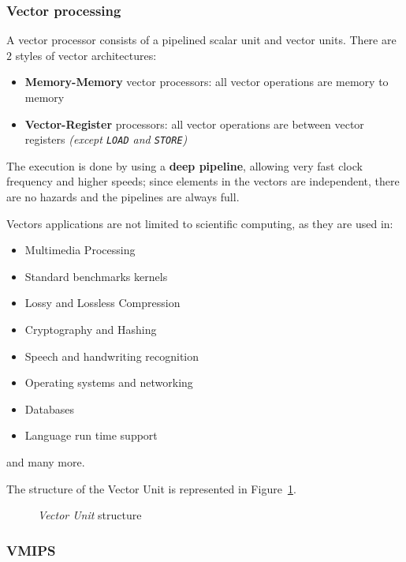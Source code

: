 \documentclass[english]{article}
\begin{document}
\subsubsection{Vector processing}

A vector processor consists of a pipelined scalar unit and vector units.
There are \(2\) styles of vector architectures:

\begin{itemize}
  \item \textbf{Memory-Memory} vector processors: all vector operations are memory to memory
  \item \textbf{Vector-Register} processors: all vector operations are between vector registers \textit{(except \texttt{LOAD} and \texttt{STORE})}
\end{itemize}

The execution is done by using a \textbf{deep pipeline}, allowing very fast clock frequency and higher speeds;
since elements in the vectors are independent, there are no hazards and the pipelines are always full.

Vectors applications are not limited to scientific computing, as they are used in:

\begin{itemize}
  \item Multimedia Processing
  \item Standard benchmarks kernels
  \item Lossy and Lossless Compression
  \item Cryptography and Hashing
  \item Speech and handwriting recognition
  \item Operating systems and networking
  \item Databases
  \item Language run time support
\end{itemize}

and many more.

The structure of the Vector Unit is represented in Figure~\ref{fig:vector-unit-structure}.

\begin{figure}
  \bigskip
  \centering
  \caption{\textit{Vector Unit} structure}
  \label{fig:vector-unit-structure}
  \bigskip
\end{figure}

\subsubsection{VMIPS}
\end{document}
